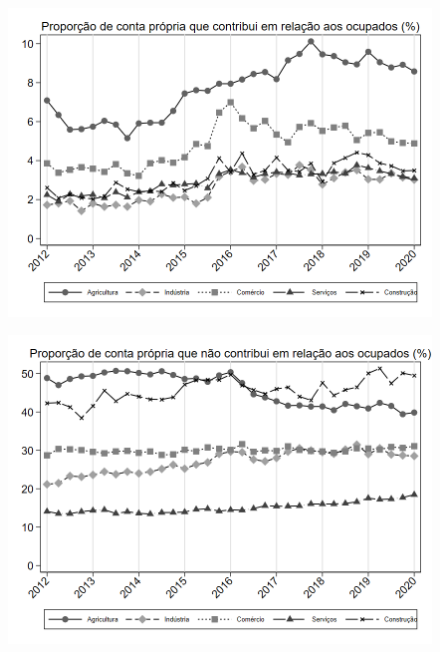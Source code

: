 \begin{frame}[label=_composicao_demografica_setor_prop_cpropriaC]{}
\textit{\hyperlink{_composicao_demografica_setor}{}}
\begin{figure}
  \centering
  \includegraphics[width=1.0\linewidth]{../../analysis/output/composicao_demografica/setor/_composicao_demografica_setor_prop_cpropriaC.png}
  \caption{}
  \label{fig:_composicao_demografica_setor_prop_cpropriaC}
\end{figure}
\end{frame}

\begin{frame}[label=_composicao_demografica_setor_prop_cpropriaNc]{}
\textit{\hyperlink{_composicao_demografica_setor}{}}
\begin{figure}
  \centering
  \includegraphics[width=1.0\linewidth]{../../analysis/output/composicao_demografica/setor/_composicao_demografica_setor_prop_cpropriaNc.png}
  \caption{}
  \label{fig:_composicao_demografica_setor_prop_cpropriaNc}
\end{figure}
\end{frame}